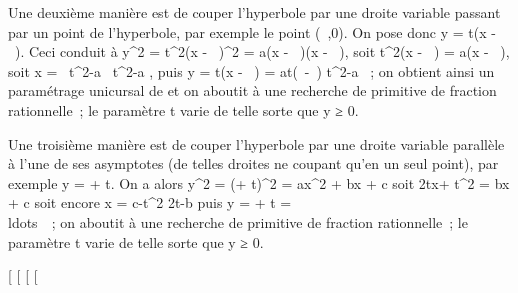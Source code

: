 \documentclass[]{article}
\begin{document}
Une deuxième manière est de couper l'hyperbole \Gamma par une droite variable
passant par un point de l'hyperbole, par exemple le point (\alpha~,0). On pose
donc y = t(x - \alpha~). Ceci conduit à y^2 = t^2(x -
\alpha~)^2 = a(x - \alpha~)(x - \beta~), soit t^2(x - \alpha~) = a(x - \beta~),
soit x = \alpha~t^2-a\beta~ \over t^2-a ,
puis y = t(x - \alpha~) = at(\beta~-\alpha~) \over t^2-a ~;
on obtient ainsi un paramétrage unicursal de \Gamma et on aboutit à une
recherche de primitive de fraction rationnelle~; le paramètre t varie de
telle sorte que y ≥ 0.

Une troisième manière est de couper l'hyperbole \Gamma par une droite
variable parallèle à l'une de ses asymptotes (de telles droites ne
coupant \Gamma qu'en un seul point), par exemple y =
\sqrtax + t. On a alors y^2 =
(\sqrtax + t)^2 = ax^2 + bx + c
soit 2tx\sqrta + t^2 = bx + c soit encore
x = c-t^2 \over
2t\sqrta-b puis y = \sqrtax + t
= \\ldots~~; on
aboutit à une recherche de primitive de fraction rationnelle~; le
paramètre t varie de telle sorte que y ≥ 0.

{[}
{[}
{[}
{[}
\end{document}
